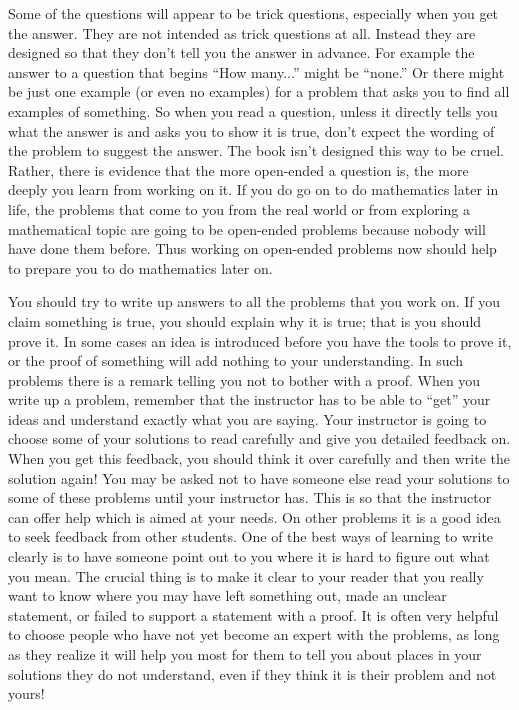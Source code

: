 \documentclass[10pt,]{book}
\theoremstyle{plain}
\theoremstyle{definition}
\theoremstyle{definition}
\numberwithin{equation}{chapter}
\begin{document}
\par
\hypertarget{p-14}{}%
Some of the questions will appear to be trick questions, especially when you get the answer. They are not intended as trick questions at all. Instead they are designed so that they don't tell you the answer in advance. For example the answer to a question that begins ``How many...'' might be ``none.'' Or there might be just one example (or even no examples) for a problem that asks you to find all examples of something. So when you read a question, unless it directly tells you what the answer is and asks you to show it is true, don't expect the wording of the problem to suggest the answer. The book isn't designed this way to be cruel. Rather, there is evidence that the more open-ended a question is, the more deeply you learn from working on it. If you do go on to do mathematics later in life, the problems that come to you from the real world or from exploring a mathematical topic are going to be open-ended problems because nobody will have done them before. Thus working on open-ended problems now should help to prepare you to do mathematics later on.%
\par
\hypertarget{p-15}{}%
You should try to write up answers to all the problems that you work on. If you claim something is true, you should explain why it is true; that is you should prove it. In some cases an idea is introduced before you have the tools to prove it, or the proof of something will add nothing to your understanding. In such problems there is a remark telling you not to bother with a proof. When you write up a problem, remember that the instructor has to be able to ``get'' your ideas and understand exactly what you are saying. Your instructor is going to choose some of your solutions to read carefully and give you detailed feedback on. When you get this feedback, you should think it over carefully and then write the solution again! You may be asked not to have someone else read your solutions to some of these problems until your instructor has. This is so that the instructor can offer help which is aimed at your needs. On other problems it is a good idea to seek feedback from other students. One of the best ways of learning to write clearly is to have someone point out to you where it is hard to figure out what you mean. The crucial thing is to make it clear to your reader that you really want to know where you may have left something out, made an unclear statement, or failed to support a statement with a proof. It is often very helpful to choose people who have not yet become an expert with the problems, as long as they realize it will help you most for them to tell you about places in your solutions they do not understand, even if they think it is their problem and not yours!%
\end{document}

